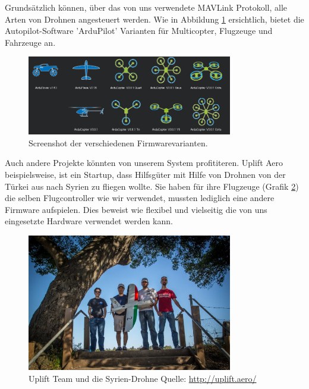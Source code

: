Grundsätzlich können, über das von uns verwendete \Gls{MAVLink} Protokoll, alle Arten von Drohnen angesteuert werden. Wie in Abbildung \ref{fig:arduScreenshot} ersichtlich, bietet die Autopilot-Software 'ArduPilot' Varianten für Multicopter, Flugzeuge und Fahrzeuge an.\\
\begin{figure}[H]
\centering
\includegraphics[width=0.8\textwidth] {images/arduScreenshot.jpg}
\caption{Screenshot der verschiedenen Firmwarevarianten.}
\label{fig:arduScreenshot}
\end{figure}

Auch andere Projekte könnten von unserem System profititeren. Uplift Aero beispielsweise, ist ein Startup, dass Hilfsgüter mit Hilfe von Drohnen von der Türkei aus nach Syrien zu fliegen wollte. Sie haben für ihre Flugzeuge (Grafik \ref{fig:uplift}) die selben Flugcontroller wie wir verwendet, mussten lediglich eine andere Firmware aufspielen. Dies beweist wie flexibel und vielseitig die von uns eingesetzte Hardware verwendet werden kann.

\begin{figure}[H]
\centering
\includegraphics[width=0.8\textwidth] {images/SyriaUplift.jpg}
\caption{Uplift Team und die Syrien-Drohne Quelle: \protect\url{http://uplift.aero/}}
\label{fig:uplift}
\end{figure}




